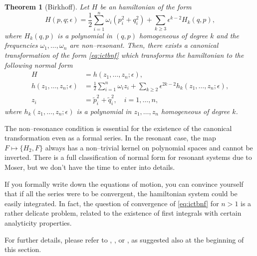 \documentclass[english,fontsize=11pt,paper=a5,oneside]{scrbook}
\newtheorem{theorem}{Theorem}[chapter]
\theoremstyle{definition}
\begin{document}
\begin{theorem}[Birkhoff]
    Let $H$ be an hamiltonian of the form
    \begin{equation}
        H(p,q; \epsilon) = \frac12 \sum_{i=1}^n \omega_i(p_i^2 + q_i^2) + \sum_{k\geq 3} \epsilon^{k-2} H_k(q,p),
    \end{equation}
    where $H_k(q,p)$ is a polynomial in $(q,p)$ homogeneous of degree $k$ and the frequencies $\omega_1,\ldots,\omega_n$ are non--resonant.
    Then, there exists a canonical transformation of the form \eqref{eq:ictbnf} which transforms the hamiltonian to the following normal form
    \begin{align}
        H &= h(z_1, \ldots, z_n; \epsilon),\\
        h(z_1,\ldots,z_n;\epsilon) &= \frac12 \sum_{i=1}^n \omega_i z_i + \sum_{k\geq 2} \epsilon^{2k-2} h_k(z_1, \ldots, z_n; \epsilon),\\
        z_i &= \widetilde p_i^2 + \widetilde q_i^2,\quad i=1,\ldots,n,
    \end{align}
    where $h_k(z_1, \ldots, z_n; \epsilon)$ is a polynomial in $z_1, \ldots, z_n$ homogeneous of degree $k$.
\end{theorem}

The non--resonance condition is essential for the existence of the canonical transformation even as a formal series. In the resonant case, the map $F \mapsto \big\{H_2, F\big\}$ always has a non--trivial kernel on polynomial spaces and cannot be inverted.
There is a full classification of normal form for resonant systems due to Moser, but we don't have the time to enter into details.

If you formally write down the equations of motion, you can convince yourself that if all the series were to be convergent, the hamiltonian system could be easily integrated.
In fact, the question of convergence of \eqref{eq:ictbnf} for $n>1$ is a rather delicate problem, related to the existence of first integrals with certain analyticity properties.

For further details, please refer to \cite{Broer_2009}, \cite[Chapter 6.5]{book:celletti}, \cite[Chapter 8.3]{book:arnoldcelestial} or \cite[Chapters 15.2 and 15.3]{book:knauf}, as suggested also at the beginning of this section.

\end{document}
